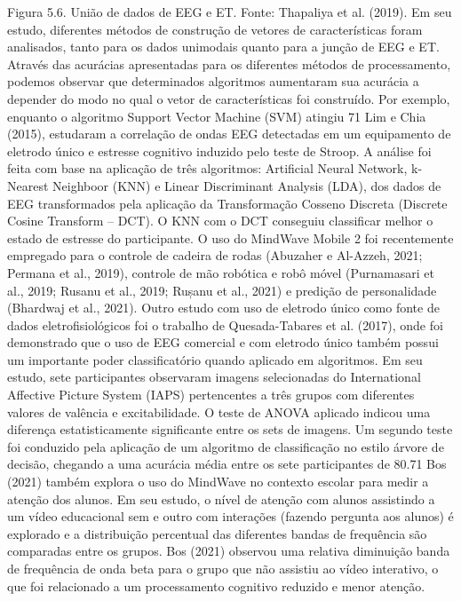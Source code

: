 Figura 5.6. União de dados de EEG e ET. Fonte: Thapaliya et al. (2019).
Em seu estudo, diferentes métodos de construção de vetores de características foram analisados, tanto para os dados unimodais quanto para a junção de EEG e ET. Através das acurácias apresentadas para os diferentes métodos de processamento, podemos observar que determinados algoritmos aumentaram sua acurácia a depender do modo no qual o vetor de características foi construído. Por exemplo, enquanto o algoritmo Support Vector Machine (SVM) atingiu 71%
Lim e Chia (2015), estudaram a correlação de ondas EEG detectadas em um equipamento de eletrodo único e estresse cognitivo induzido pelo teste de Stroop. A análise foi feita com base na aplicação de três algoritmos: Artificial Neural Network, k-Nearest Neighboor (KNN) e Linear Discriminant Analysis (LDA), dos dados de EEG transformados pela aplicação da Transformação Cosseno Discreta (Discrete Cosine Transform – DCT). O KNN com o DCT conseguiu classificar melhor o estado de estresse do participante.
O uso do MindWave Mobile 2 foi recentemente empregado para o controle de cadeira de rodas (Abuzaher e Al-Azzeh, 2021; Permana et al., 2019), controle de mão robótica e robô móvel (Purnamasari et al., 2019; Rusanu et al., 2019; Rușanu et al., 2021) e predição de personalidade (Bhardwaj et al., 2021). Outro estudo com uso de eletrodo único como fonte de dados eletrofisiológicos foi o trabalho de Quesada-Tabares et al. (2017), onde foi demonstrado que o uso de EEG comercial e com eletrodo único também possui um importante poder classificatório quando aplicado em algoritmos. Em seu estudo, sete participantes observaram imagens selecionadas do International Affective Picture System (IAPS) pertencentes a três grupos com diferentes valores de valência e excitabilidade. O teste de ANOVA aplicado indicou uma diferença estatisticamente significante entre os sets de imagens. Um segundo teste foi conduzido pela aplicação de um algoritmo de classificação no estilo árvore de decisão, chegando a uma acurácia média entre os sete participantes de 80.71%
Bos (2021) também explora o uso do MindWave no contexto escolar para medir a atenção dos alunos. Em seu estudo, o nível de atenção com alunos assistindo a um vídeo educacional sem e outro com interações (fazendo pergunta aos alunos) é explorado e a distribuição percentual das diferentes bandas de frequência são comparadas entre os grupos. Bos (2021) observou uma relativa diminuição banda de frequência de onda beta para o grupo que não assistiu ao vídeo interativo, o que foi relacionado a um processamento cognitivo reduzido e menor atenção.
